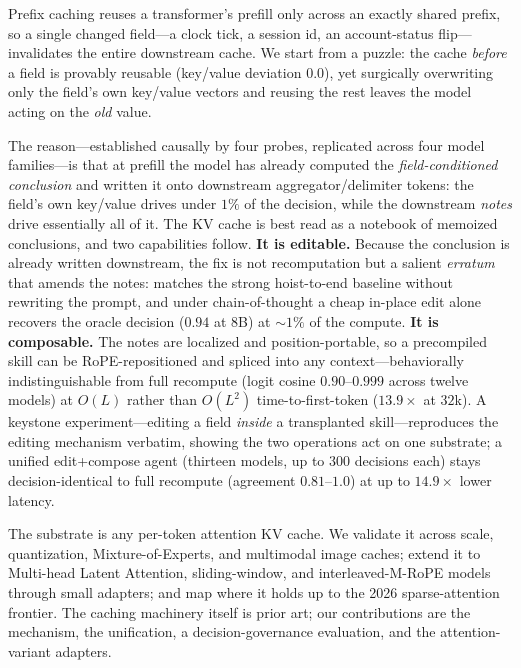 Prefix caching reuses a transformer's prefill only across an exactly shared prefix, so a single changed
field---a clock tick, a session id, an account-status flip---invalidates the entire downstream cache. We
start from a puzzle: the cache \emph{before} a field is provably reusable (key/value deviation $0.0$), yet
surgically overwriting only the field's own key/value vectors and reusing the rest leaves the model acting
on the \emph{old} value.

The reason---established causally by four probes, replicated across four model families---is that at
prefill the model has already computed the \emph{field-conditioned conclusion} and written it onto
downstream aggregator/delimiter tokens: the field's own key/value drives under $1\%$ of the decision,
while the downstream \emph{notes} drive essentially all of it. The KV cache is best read as a notebook of
memoized conclusions, and two capabilities follow.
\textbf{It is editable.} Because the conclusion is already written downstream, the fix is not
recomputation but a salient \emph{erratum} that amends the notes: \fielderr{} matches the strong
hoist-to-end baseline without rewriting the prompt, and under chain-of-thought a cheap in-place edit alone
recovers the oracle decision ($0.94$ at $8$B) at ${\sim}1\%$ of the compute.
\textbf{It is composable.} The notes are localized and position-portable, so a precompiled skill can be
RoPE-repositioned and spliced into any context---behaviorally indistinguishable from full recompute (logit
cosine $0.90$--$0.999$ across twelve models) at $O(L)$ rather than $O(L^2)$ time-to-first-token
($13.9\times$ at $32$k). A keystone experiment---editing a field \emph{inside} a transplanted skill---reproduces
the editing mechanism verbatim, showing the two operations act on one substrate; a unified
edit+compose agent (thirteen models, up to $300$ decisions each) stays decision-identical to full
recompute (agreement $0.81$--$1.0$) at up to $14.9\times$ lower latency.

The substrate is any per-token attention KV cache. We validate it across scale, quantization,
Mixture-of-Experts, and multimodal image caches; extend it to Multi-head Latent Attention, sliding-window,
and interleaved-M-RoPE models through small adapters; and map where it holds up to the 2026 sparse-attention
frontier. The caching machinery itself is prior art; our contributions are the mechanism, the unification, a
decision-governance evaluation, and the attention-variant adapters.
